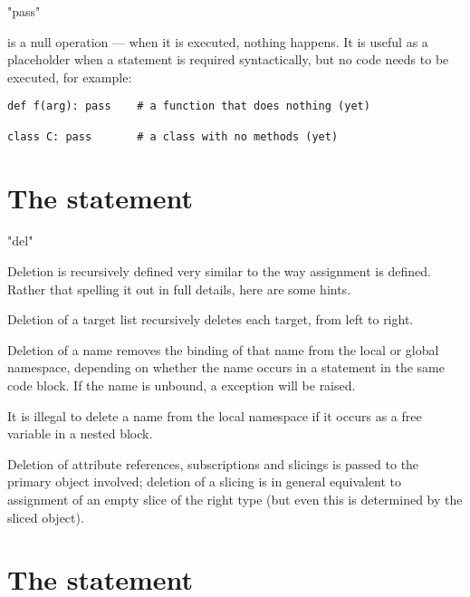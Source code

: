 \begin{productionlist}
             {"pass"}
\end{productionlist}

 is a null operation --- when it is executed, nothing
happens.  It is useful as a placeholder when a statement is
required syntactically, but no code needs to be executed, for example:

\begin{verbatim}
def f(arg): pass    # a function that does nothing (yet)

class C: pass       # a class with no methods (yet)
\end{verbatim}


\section{The  statement \label{del}}

\begin{productionlist}
             {"del" }
\end{productionlist}

Deletion is recursively defined very similar to the way assignment is
defined. Rather that spelling it out in full details, here are some
hints.

Deletion of a target list recursively deletes each target, from left
to right.

Deletion of a name removes the binding of that name 
from the local or global namespace, depending on whether the name
occurs in a  statement in the same code block.  If the
name is unbound, a  exception will be raised.

It is illegal to delete a name from the local namespace if it occurs
as a free variable in a nested block.

Deletion of attribute references, subscriptions and slicings
is passed to the primary object involved; deletion of a slicing
is in general equivalent to assignment of an empty slice of the
right type (but even this is determined by the sliced object).


\section{The  statement \label{print}}

